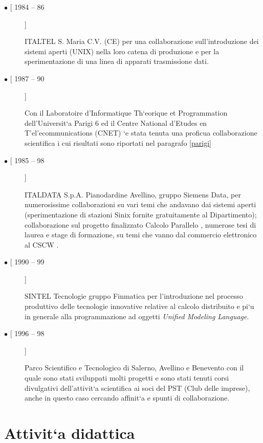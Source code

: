 \documentclass[11pt]{article}
\newlength{\boxsize}
\begin{document}
\begin{description}
\item [$ \bullet $ [ 1984 -- 86]] \hfill \parbox[t]{\boxsize} {
ITALTEL S. Maria C.V.  (CE) per una collaborazione sull'introduzione
dei sistemi aperti (UNIX) nella loro catena di produzione e per la
sperimentazione di una linea di apparati trasmissione dati. }

\item [$ \bullet $ [ 1987 -- 90]] \hfill \parbox[t]{\boxsize} { Con il
Laboratoire d'Informatique Th\a`eorique et Programmation
dell'Universit\a`a Parigi 6 ed il Centre National d'Etudes en
T\a'el\a'ecommunications (CNET) \a`e stata tenuta una proficua
collaborazione scientifica i cui risultati sono riportati nel
paragrafo \ref{parigi}
}

\item [$ \bullet $ [ 1985 -- 98]] \hfill \parbox[t]{\boxsize} {
ITALDATA S.p.A. Pianodardine Avellino, gruppo Siemens Data, per
numerosissime collaborazioni su vari temi che andavano dai sistemi
aperti (sperimentazione di stazioni Sinix fornite gratuitamente al
Dipartimento); collaborazione sul progetto finalizzato Calcolo
Parallelo \cite{AICA:1,AICA:2}, numerose tesi di laurea e stage di
formazione, su temi che vanno dal commercio elettronico al CSCW
\cite{ECom:1,ECom:2,CABOTO:98}.
}

\item [$ \bullet $ [ 1990 -- 99]] \hfill \parbox[t]{\boxsize} {
SINTEL Tecnologie gruppo Finmatica per l'introduzione nel processo
produttivo delle tecnologie innovative relative al calcolo distribuito
e pi\a`u in generale alla programmazione ad oggetti {\sl Unified Modeling Language}.
}

\item [$ \bullet $ [ 1996 -- 98]] \hfill \parbox[t]{\boxsize} { Parco
Scientifico e Tecnologico di Salerno, Avellino e Benevento con il
quale sono stati sviluppati molti progetti e sono stati tenuti corsi
divulgativi dell'attivit\a`a scientifica ai soci del PST (Club delle
imprese), anche in questo caso cercando affinit\a`a e spunti di
collaborazione.
}
\end{description}


\section{Attivit\a`a didattica}
\end{document}
